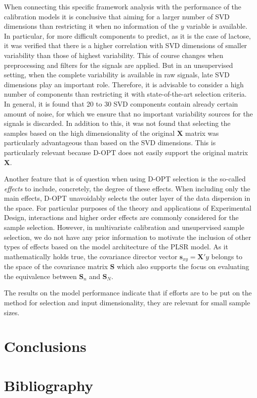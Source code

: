 \documentclass{article}
\begin{document}
When connecting this specific framework analysis with the performance of the calibration models it is conclusive that aiming for a larger number of SVD dimensions than restricting it when no information of the $y$ variable is available. In particular, for more difficult components to predict, as it is the case of lactose, it was verified that there is a higher correlation with SVD dimensions of smaller variability than those of highest variability. This of course changes when preprocessing and filters for the signals are applied. But in an unsupervised setting, when the complete variability is available in raw signals, late SVD dimensions play an important role. Therefore, it is advisable to consider a high number of components than restricting it with state-of-the-art selection criteria. In general, it is found that 20 to 30 SVD components contain already certain amount of noise, for which we ensure that no important variability sources for the signals is discarded. In addition to this, it was not found that selecting the samples based on the high dimensionality of the original $\mathbf{X}$ matrix was particularly advantageous than based on the SVD dimensions. This is particularly relevant because D-OPT does not easily support the original matrix $\mathbf{X}$.

Another feature that is of question when using D-OPT selection is the so-called \emph{effects} to include, concretely, the degree of these effects. When including only the main effects, D-OPT unavoidably selects the outer layer of the data dispersion in the space. For particular purposes of the theory and applications of Experimental Design, interactions and higher order effects are commonly considered for the sample selection. However, in multivariate calibration and unsupervised sample selection, we do not have any prior information to motivate the inclusion of other types of effects based on the model architecture of the PLSR model. As it mathematically holds true, the covariance director vector $\mathbf{s}_{xy} = \mathbf{X}'y$ belongs to the space of the covariance matrix $\mathbf{S}$ which also supports the focus on evaluating the equivalence between $\mathbf{S}_n$ and $\mathbf{S}_N$. 


The results on the model performance indicate that if efforts are to be put on the method for selection and input dimensionality, they are relevant for small sample sizes. 




\section*{Conclusions}\label{conclusions}


\section*{Bibliography}
\end{document}
